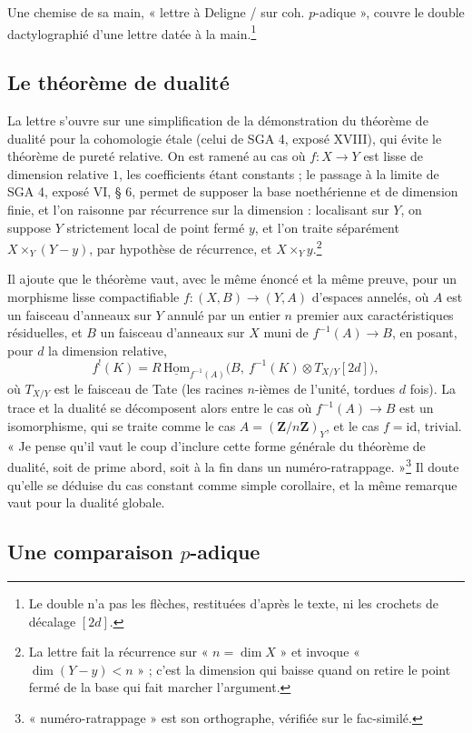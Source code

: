 \documentclass[11pt,a4paper]{article}
\begin{document}
Une chemise de sa main, « lettre à Deligne / sur coh. $p$-adique », couvre le
double dactylographié d'une lettre datée à la main.\footnote{Le double n'a
pas les flèches, restituées d'après le texte, ni les crochets de décalage
$[2d]$.}

\subsection*{Le théorème de dualité}

La lettre s'ouvre sur une simplification de la démonstration du théorème
de dualité pour la cohomologie étale (celui de SGA 4, exposé XVIII), qui
évite le théorème de pureté relative. On est ramené au cas où
$f : X \to Y$ est lisse de dimension relative $1$, les coefficients étant
constants ; le passage à la limite de SGA 4, exposé VI, § 6, permet de
supposer la base noethérienne et de dimension finie, et l'on raisonne par
récurrence sur la dimension : localisant sur $Y$, on suppose $Y$ strictement
local de point fermé $y$, et l'on traite séparément $X \times_Y (Y - y)$,
par hypothèse de récurrence, et $X \times_Y y$.\footnote{La lettre fait la
récurrence sur « $n = \dim X$ » et invoque « $\dim(Y - y) < n$ » ; c'est
la dimension qui baisse quand on retire le point fermé de la base qui fait
marcher l'argument.}

Il ajoute que le théorème vaut, avec le même énoncé et la même preuve, pour
un morphisme lisse compactifiable $f : (X, B) \to (Y, A)$ d'espaces annelés,
où $A$ est un faisceau d'anneaux sur $Y$ annulé par un entier $n$ premier aux
caractéristiques résiduelles, et $B$ un faisceau d'anneaux sur $X$ muni de
$f^{-1}(A) \to B$, en posant, pour $d$ la dimension relative,
\[
f^{!}(K) = R\,\underline{\mathrm{Hom}}_{f^{-1}(A)}\bigl(B,\ f^{-1}(K)
\otimes T_{X/Y}[2d]\bigr),
\]
où $T_{X/Y}$ est le faisceau de Tate (les racines $n$-ièmes de l'unité,
tordues $d$ fois). La trace et la dualité se décomposent alors entre le cas
où $f^{-1}(A) \to B$ est un isomorphisme, qui se traite comme le cas
$A = (\mathbf{Z}/n\mathbf{Z})_Y$, et le cas $f = \mathrm{id}$, trivial. « Je
pense qu'il vaut le coup d'inclure cette forme générale du théorème de
dualité, soit de prime abord, soit à la fin dans un
numéro-ratrappage. »\footnote{« numéro-ratrappage » est son orthographe,
vérifiée sur le fac-similé.} Il doute qu'elle se déduise du cas constant
comme simple corollaire, et la même remarque vaut pour la dualité globale.

\subsection*{Une comparaison $p$-adique}
\end{document}
